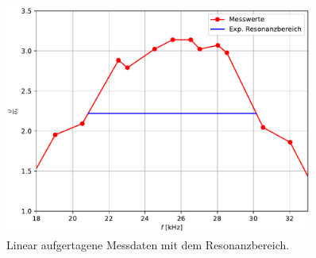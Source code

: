 \begin{figure}[H]
  \centering
  \includegraphics[width=0.90\textwidth]{plot_c.pdf}
  \caption{Linear aufgertagene Messdaten mit dem Resonanzbereich.}
  \label{fig:Resonanzbereich}
\end{figure}

